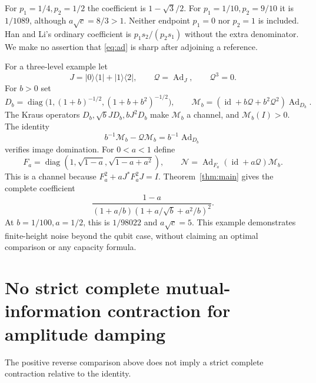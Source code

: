 \documentclass[11pt,a4paper]{article}
\theoremstyle{remark}\newtheorem{remark}[theorem]{Remark}
\newcommand{\id}{\operatorname{id}}
\newcommand{\Ad}{\operatorname{Ad}}
\newcommand{\cQ}{\mathcal Q}
\newcommand{\cM}{\mathcal M}
\newcommand{\cN}{\mathcal N}
\newcommand{\ket}[1]{\lvert #1\rangle}
\newcommand{\bra}[1]{\langle #1\rvert}
\begin{document}
For $p_1=1/4,p_2=1/2$ the coefficient is $1-\sqrt3/2$.
For $p_1=1/10,p_2=9/10$ it is $1/1089$, although
$a\sqrt c=8/3>1$. Neither endpoint $p_1=0$ nor $p_2=1$ is included.
Han and Li's ordinary coefficient \cite[Theorem~4]{hanli} is
$p_1s_2/(p_2s_1)$ without the extra denominator.
We make no assertion that \eqref{eq:ad} is sharp after adjoining a reference.

For a three-level example let
\[
 J=\ket0\bra1+\ket1\bra2,\qquad \cQ=\Ad_J,\qquad \cQ^3=0 .
\]
For $b>0$ set
\[
 D_b=\operatorname{diag}\bigl(1,(1+b)^{-1/2},
                                  (1+b+b^2)^{-1/2}\bigr),\qquad
 \cM_b=(\id+b\cQ+b^2\cQ^2)\Ad_{D_b}.
\]
The Kraus operators $D_b,\sqrt b JD_b,bJ^2D_b$ make $\cM_b$ a channel,
and $\cM_b(I)>0$.
The identity
\[
 b^{-1}\cM_b-\cQ\cM_b=b^{-1}\Ad_{D_b}
\]
verifies image domination.
For $0<a<1$ define
\[
 F_a=\operatorname{diag}(1,\sqrt{1-a},\sqrt{1-a+a^2}),\qquad
 \cN=\Ad_{F_a}(\id+a\cQ)\cM_b.
\]
This is a channel because
$F_a^2+aJ^*F_a^2J=I$.
Theorem~\ref{thm:main} gives the complete coefficient
\begin{equation}
 \frac{1-a}
 {(1+a/b)(1+a/\sqrt b+a^2/b)^2}.
 \label{eq:qutrit}
\end{equation}
At $b=1/100,a=1/2$, this is $1/98022$ and $a\sqrt c=5$.
This example demonstrates finite-height noise beyond the qubit case,
without claiming an optimal comparison or any capacity formula.

\section{No strict complete mutual-information contraction for amplitude damping}
The positive reverse comparison above does not imply a strict
complete contraction relative to the identity.
\end{document}
